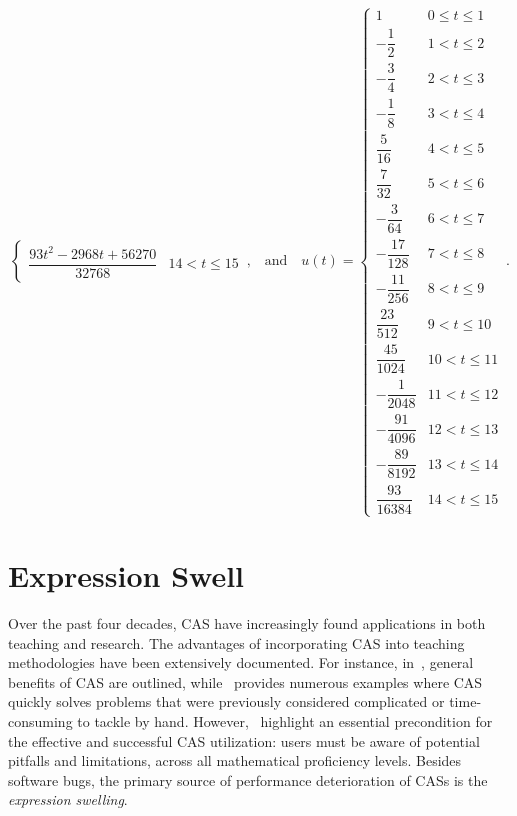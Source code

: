 \begin{example}
\begin{footnotesize}
\begin{equation*}
\begin{cases}
      \dfrac{93 t^2-2968 t+56270}{32768} & 14<t\leq 15
    \end{cases} \, \text{,}
    \quad \text{and} \quad u(t) = \begin{cases}
      1 & 0\leq t\leq 1 \\[0.2em]
      -\dfrac{1}{2} & 1<t\leq 2 \\[0.2em]
      -\dfrac{3}{4} & 2<t\leq 3 \\[0.2em]
      -\dfrac{1}{8} & 3<t\leq 4 \\[0.2em]
      \dfrac{5}{16} & 4<t\leq 5 \\[0.2em]
      \dfrac{7}{32} & 5<t\leq 6 \\[0.2em]
      -\dfrac{3}{64} & 6<t\leq 7 \\[0.2em]
      -\dfrac{17}{128} & 7<t\leq 8 \\[0.2em]
      -\dfrac{11}{256} & 8<t\leq 9 \\[0.2em]
      \dfrac{23}{512} & 9<t\leq 10 \\[0.2em]
      \dfrac{45}{1024} & 10<t\leq 11 \\[0.2em]
      -\dfrac{1}{2048} & 11<t\leq 12 \\[0.2em]
      -\dfrac{91}{4096} & 12<t\leq 13 \\[0.2em]
      -\dfrac{89}{8192} & 13<t\leq 14 \\[0.2em]
      \dfrac{93}{16384} & 14<t\leq 15
    \end{cases} \, \text{.}
  \end{equation*}
\end{footnotesize}
\end{example}


\section{Expression Swell}
\label{chap3:sec:expression_swell}

Over the past four decades, \ac{CAS} have increasingly found applications in both teaching and research. The advantages of incorporating \ac{CAS} into teaching methodologies have been extensively documented. For instance, in~\citet{stoutemyer1984radical}, general benefits of \ac{CAS} are outlined, while~\citet{pavelle1985macsyma} provides numerous examples where \ac{CAS} quickly solves problems that were previously considered complicated or time-consuming to tackle by hand. However,~\citet{mitic1994pitfalls} highlight an essential precondition for the effective and successful \ac{CAS} utilization: users must be aware of potential pitfalls and limitations, across all mathematical proficiency levels. Besides software bugs, the primary source of performance deterioration of \acp{CAS} is the \emph{expression swelling}.

